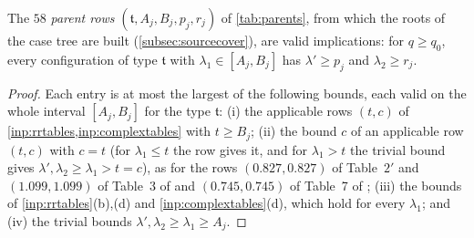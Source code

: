 \documentclass[11pt]{amsart}
\numberwithin{equation}{section}
\theoremstyle{plain}
\theoremstyle{definition}
\theoremstyle{remark}
\newcommand{\1}{\mathbf{1}}
\begin{document}
\begin{proposition}\label{prop:parentrows}
The $58$ \emph{parent rows} $(\mathfrak t,A_j,B_j,p_j,r_j)$ of \cref{tab:parents}, from which the roots of
the case tree are built (\cref{subsec:sourcecover}), are valid implications: for $q\ge q_0$, every
configuration of type $\mathfrak t$ with $\lambda_1\in[A_j,B_j]$ has $\lambda'\ge p_j$ and $\lambda_2\ge r_j$.
\end{proposition}

\begin{proof}
Each entry is at most the largest of the following bounds, each valid on the whole interval $[A_j,B_j]$ for
the type $\mathfrak t$: (i) the applicable rows $(t,c)$ of \cref{inp:rrtables,inp:complextables} with $t\ge B_j$; (ii) the
bound $c$ of an applicable row $(t,c)$ with $c=t$ (for $\lambda_1\le t$ the row gives it, and for
$\lambda_1>t$ the trivial bound gives $\lambda',\lambda_2\ge\lambda_1>t=c$), as for the rows
$(0.827,0.827)$ of Table~$2'$ and $(1.099,1.099)$ of Table~3 of \cite{Xylouris2011nullstellen} and $(0.745,0.745)$
of Table~7 of \cite{HeathBrown1992zero}; (iii) the bounds of \cref{inp:rrtables}(b),(d) and
\cref{inp:complextables}(d), which hold for every $\lambda_1$; and (iv) the trivial bounds
$\lambda',\lambda_2\ge\lambda_1\ge A_j$.
\end{proof}
\end{document}
